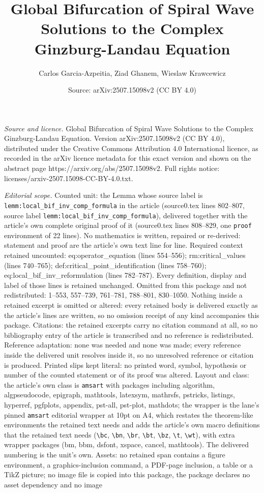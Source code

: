 \documentclass[10pt,a4paper]{amsart}
\title[Global Bifurcation of Spiral Wave Solutions to the Complex G]{Global Bifurcation of Spiral Wave Solutions to the Complex Ginzburg-Landau Equation}
\author{Carlos Garcia-Azpeitia, Ziad Ghanem, Wieslaw Krawcewicz}
\date{Source: arXiv:2507.15098v2 (CC BY 4.0)}
\begin{document}
\maketitle

\noindent\emph{Source and licence.} Global Bifurcation of Spiral Wave Solutions to the Complex Ginzburg-Landau Equation. Version arXiv:2507.15098v2 (CC BY 4.0), distributed under the Creative Commons Attribution 4.0 International licence, as recorded in the arXiv licence metadata for this exact version and shown on the abstract page https://arxiv.org/abs/2507.15098v2. Full rights notice: licenses/arxiv-2507.15098-CC-BY-4.0.txt.\par\smallskip

\noindent\textit{Editorial scope.} Counted unit: the Lemma whose source label is \texttt{lemm:local\_bif\_inv\_comp\_formula} in the article (source0.tex lines 802--807, source label \texttt{lemm:local\_bif\_inv\_comp\_formula}), delivered together with the article's own complete original proof of it (source0.tex lines 808--829, one \texttt{proof} environment of 22 lines). No mathematics is written, repaired or re-derived: statement and proof are the article's own text line for line. Required context retained uncounted: eq:operator\_equation (lines 554--556); rm:critical\_values (lines 740--765); def:critical\_point\_identification (lines 758--760); eq:local\_bif\_inv\_reformulation (lines 782--787). Every definition, display and label of those lines is retained unchanged. Omitted from this package and not redistributed: 1--553, 557--739, 761--781, 788--801, 830--1050. Nothing inside a retained excerpt is omitted or altered: every retained body is delivered exactly as the article's lines are written, so no omission receipt of any kind accompanies this package. Citations: the retained excerpts carry no citation command at all, so no bibliography entry of the article is transcribed and no reference is redistributed. Reference adaptation: none was needed and none was made; every reference inside the delivered unit resolves inside it, so no unresolved reference or citation is produced. Printed slips kept literal: no printed word, symbol, hypothesis or number of the counted statement or of its proof was altered. Layout and class: the article's own class is \texttt{amsart} with packages including algorithm, algpseudocode, epigraph, mathtools, latexsym, mathrsfs, pstricks, listings, hyperref, pgfplots, appendix, pst-all, pst-plot, mathdots; the wrapper is the lane's pinned \texttt{amsart} editorial wrapper at 10pt on A4, which restates the theorem-like environments the retained text needs and adds the article's own macro definitions that the retained text needs (\texttt{\textbackslash bc}, \texttt{\textbackslash bn}, \texttt{\textbackslash br}, \texttt{\textbackslash bt}, \texttt{\textbackslash bz}, \texttt{\textbackslash t}, \texttt{\textbackslash wt}), with extra wrapper packages (bm, bbm, dsfont, xspace, cancel, mathtools). The delivered numbering is the unit's own. Assets: no retained span contains a figure environment, a graphics-inclusion command, a PDF-page inclusion, a table or a TikZ picture; no image file is copied into this package, the package declares no asset dependency and no image 
\end{document}
